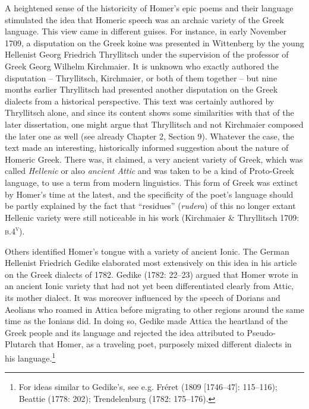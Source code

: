 \documentclass[12pt]{article}
\newenvironment{styleStandard}{\renewcommand\baselinestretch{1.25}\setlength\leftskip{0in}\setlength\rightskip{0in}\setlength\parindent{0.1972in}\setlength\parfillskip{0pt plus 1fil}\setlength\parskip{0in plus 1pt}\writerlistparindent\writerlistleftskip\leavevmode\normalfont\normalsize\writerlistlabel\ignorespaces}{\unskip\vspace{0in plus 1pt}\par}
\newcommand\writerlistleftskip{}
\newcommand\writerlistparindent{}
\newcommand\writerlistlabel{}
\begin{document}
\begin{styleStandard}
A heightened sense of the historicity of Homer’s epic poems and their language stimulated the idea that Homeric speech was an archaic variety of the Greek language. This view came in different guises. For instance, in early November 1709, a disputation on the Greek koine was presented in Wittenberg by the young Hellenist Georg Friedrich Thryllitsch under the supervision of the professor of Greek Georg Wilhelm Kirchmaier. It is unknown who exactly authored the disputation – Thryllitsch, Kirchmaier, or both of them together – but nine months earlier Thryllitsch had presented another disputation on the Greek dialects from a historical perspective. This text was certainly authored by Thryllitsch alone, and since its content shows some similarities with that of the later dissertation, one might argue that Thryllitsch and not Kirchmaier composed the later one as well (see already Chapter 2, Section 9). Whatever the case, the text made an interesting, historically informed suggestion about the nature of Homeric Greek. There was, it claimed, a very ancient variety of Greek, which was called \textit{Hellenic} or also \textit{ancient Attic} and was taken to be a kind of Proto-Greek language, to use a term from modern linguistics. This form of Greek was extinct by Homer’s time at the latest, and the specificity of the poet’s language should be partly explained by the fact that “residues” (\textit{rudera}) of this no longer extant Hellenic variety were still noticeable in his work (Kirchmaier \& Thryllitsch 1709: \textsc{b.4}\textsc{\textsuperscript{v}}).
\end{styleStandard}

\begin{styleStandard}
Others identified Homer’s tongue with a variety of ancient Ionic. The German Hellenist Friedrich Gedike elaborated most extensively on this idea in his article on the Greek dialects of 1782. Gedike (1782: 22–23) argued that Homer wrote in an ancient Ionic variety that had not yet been differentiated clearly from Attic, its mother dialect. It was moreover influenced by the speech of Dorians and Aeolians who roamed in Attica before migrating to other regions around the same time as the Ionians did. In doing so, Gedike made Attica the heartland of the Greek people and its language and rejected the idea attributed to Pseudo-Plutarch that Homer, as a traveling poet, purposely mixed different dialects in his language.\footnote{ For ideas similar to Gedike’s, see e.g. Fréret (1809 [1746–47]: 115–116); Beattie (1778: 202); Trendelenburg (1782: 175–176).}
\end{styleStandard}
\end{document}
